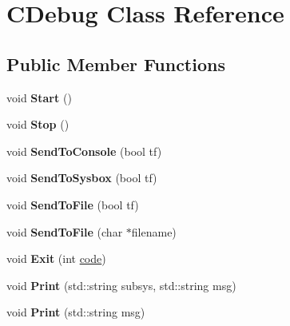 \hypertarget{class_c_debug}{\section{C\+Debug Class Reference}
\label{class_c_debug}
}
\subsection*{Public Member Functions}
\begin{DoxyCompactItemize}
\item 
\hypertarget{class_c_debug_a66e5b743f3076c83ffb4008990d6d08d}{void {\bfseries Start} ()}\label{class_c_debug_a66e5b743f3076c83ffb4008990d6d08d}

\item 
\hypertarget{class_c_debug_ab23c5147990ae157b1c5d46d1150bdff}{void {\bfseries Stop} ()}\label{class_c_debug_ab23c5147990ae157b1c5d46d1150bdff}

\item 
\hypertarget{class_c_debug_aa1412e45e8ed1fca2e4fb71d3c485975}{void {\bfseries Send\+To\+Console} (bool tf)}\label{class_c_debug_aa1412e45e8ed1fca2e4fb71d3c485975}

\item 
\hypertarget{class_c_debug_a42a181be1eaeba95f3dc4e3c1ab92120}{void {\bfseries Send\+To\+Sysbox} (bool tf)}\label{class_c_debug_a42a181be1eaeba95f3dc4e3c1ab92120}

\item 
\hypertarget{class_c_debug_a46a44dfe5495413a7126f474b5b1c933}{void {\bfseries Send\+To\+File} (bool tf)}\label{class_c_debug_a46a44dfe5495413a7126f474b5b1c933}

\item 
\hypertarget{class_c_debug_a77839abce006ba3f72765b493c11086f}{void {\bfseries Send\+To\+File} (char $\ast$filename)}\label{class_c_debug_a77839abce006ba3f72765b493c11086f}

\item 
\hypertarget{class_c_debug_a4129306d117870a14e418009daf8bb7f}{void {\bfseries Exit} (int \hyperlink{structcode}{code})}\label{class_c_debug_a4129306d117870a14e418009daf8bb7f}

\item 
\hypertarget{class_c_debug_ad35685c3df4c295bbff1180b940806f1}{void {\bfseries Print} (std\+::string subsys, std\+::string msg)}\label{class_c_debug_ad35685c3df4c295bbff1180b940806f1}

\item 
\hypertarget{class_c_debug_a5943c62d39b8f52f9c64a077d240d876}{void {\bfseries Print} (std\+::string msg)}\label{class_c_debug_a5943c62d39b8f52f9c64a077d240d876}


\end{DoxyCompactItemize}
